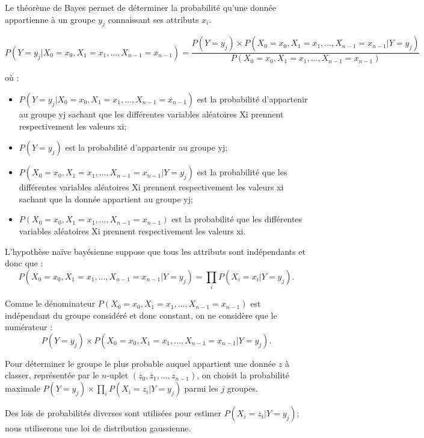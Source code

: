 Le théorème de Bayes permet de déterminer la probabilité qu’une donnée appartienne à un groupe $y_j$
connaissant ses attributs $x_i$.

$$
P\left(Y=y_j  | X_0 = x_0, X_1 = x_1, ..., X_{n-1} = x_{n-1} \right) 
= \dfrac{P\left(Y = y_j\right) \times  P\left(X_0 = x_0, X_1 = x_1, ..., X_{n-1} = x_{n-1} |Y = y_j\right)}{ P\left(X_0 = x_0, X_1 = x_1, ..., X_{n-1} = x_{n-1} \right)}
$$

où :
\begin{itemize}
\item $P\left(Y=y_j  | X_0 = x_0, X_1 = x_1, ..., X_{n-1} = x_{n-1} \right)$ est la probabilité d’appartenir au groupe yj sachant
que les différentes variables aléatoires Xi prennent respectivement les valeurs xi;
\item $P\left(Y = y_j\right)$ est la probabilité d’appartenir au groupe yj;
\item $P\left(X_0 = x_0, X_1 = x_1, ..., X_{n-1} = x_{n-1} |Y = y_j\right)$ est la probabilité que les différentes variables
aléatoires Xi prennent respectivement les valeurs xi sachant que la donnée appartient au groupe
yj;
\item $P\left(X_0 = x_0, X_1 = x_1, ..., X_{n-1} = x_{n-1} \right)$ est la probabilité que les différentes variables aléatoires Xi prennent respectivement les valeurs xi.
\end{itemize}

L’hypothèse naïve bayésienne suppose que tous les attributs sont indépendants et donc que :
$$P\left(X_0 = x_0, X_1 = x_1, ..., X_{n-1} = x_{n-1} |Y = y_j\right) = \prod\limits_{i} P\left( X_i=x_i | Y=y_j\right).$$



Comme le dénominateur $P\left(X_0 = x_0, X_1 = x_1, ..., X_{n-1} = x_{n-1}\right)$ est indépendant du groupe considéré et donc constant, on ne considère que le numérateur :
$$P\left(Y = y_j\right) \times  P\left(X_0 = x_0, X_1 = x_1, ..., X_{n-1} = x_{n-1} |Y = y_j\right).$$

Pour déterminer le groupe le plus probable auquel appartient une donnée $z$ à classer, représentée par
le $n$-uplet $(z_0, z_1, ..., z_{n-1})$, on choisit la probabilité maximale $P\left(Y = y_j\right) \times \prod\limits_{i}P\left(X_i=z_i | Y=y_j\right)$  parmi
les $j$ groupes.

Des lois de probabilités diverses sont utilisées pour estimer $P\left(X_i = z_i|Y = y_j\right)$; nous utiliserons une loi de distribution gaussienne.

\fi

